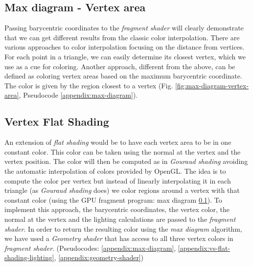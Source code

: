 
\subsection{Max diagram - Vertex area} \label{section:max-diagram}
Passing barycentric coordinates to the \textit{fragment shader} will clearly demonstrate that we can get different results from the classic color interpolation. \cite{WEBSITE:redbloggames}
There are various approaches to color interpolation focusing on the distance from vertices. For each point in a triangle, we can easily determine its closest vertex, which we use as a cue for coloring.
Another approach, different from the above, can be defined as coloring vertex areas based on the maximum barycentric coordinate.
The color is given by the region closest to a vertex (Fig. \ref{fig:max-diagram-vertex-area}, Pseudocode \ref{appendix:max-diagram}).


\subsection{Vertex Flat Shading} \label{section:extend-flat-shading-lighting}
An extension of \textit{flat shading} would be to have each vertex area to be in one constant color. This color can be taken using the normal at the vertex and the vertex position.
The color will then be computed as in \textit{Gouraud shading} avoiding the automatic interpolation of colors provided by OpenGL.
The idea is to compute the color per vertex but instead of linearly interpolating it in each triangle (as \textit{Gouraud shading} does) we color regions around a vertex with that constant color (using the GPU fragment program: max diagram \ref{section:max-diagram}).
To implement this approach, the barycentric coordinates, the vertex color, the normal at the vertex and the lighting calculations are passed to the \textit{fragment shader}.
In order to return the resulting color using the \textit{max diagram} algorithm, we have used a \textit{Geometry shader} that has access to all three vertex colors in \textit{fragment shader}. (Pseudocodes: \ref{appendix:max-diagram}, \ref{appendix:vs-flat-shading-lighting}, \ref{appendix:geometry-shader})

